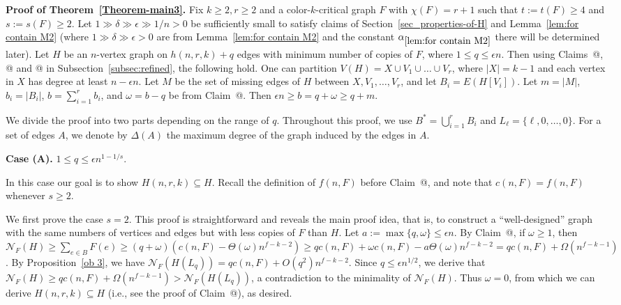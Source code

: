\documentclass[10pt]{article}
\makeatletter
\newcommand*{\rom}[1]{\expandafter\@slowromancap\romannumeral #1@}
\makeatother
\begin{document}
\medskip

{\noindent \bf Proof of Theorem~\ref{Theorem-main3}.}
Fix $k\geq 2, r\geq 2$ and a color-$k$-critical graph $F$ with $\chi(F)=r+1$ such that $t:=t(F)\geq 4$ and $s:=s(F)\geq 2$.
Let $1\gg\delta\gg \epsilon\gg 1/n>0$ be sufficiently small to satisfy claims of Section~\ref{sec_properties-of-H} and Lemma~\ref{lem:for contain M2} (where $1\gg\delta\gg \epsilon>0$ are from Lemma~\ref{lem:for contain M2} and the constant $\alpha_{\ref{lem:for contain M2}}$ there will be determined later).
Let $H$ be an $n$-vertex graph on $h(n,r,k)+q$ edges with minimum number of copies of $F$, where $1\leq q\leq \epsilon n$.
Then using Claims~\rom{1}, \rom{2} and \rom{3} in Subsection~\ref{subsec:refined}, the following hold.
One can partition $V(H)=X\cup V_1\cup \ldots \cup V_r$, where $|X|=k-1$ and each vertex in $X$ has degree at least $n-\epsilon n$.
Let $M$ be the set of missing edges of $H$ between $X, V_1,\ldots, V_r$, and let $B_i=E(H[V_i])$.
Let $m=|M|$, $b_i=|B_i|$, $b=\sum_{i=1}^{r}b_i$, and $\omega=b-q$ be from Claim~\rom{3}.
Then $\epsilon n\geq b=q+\omega\geq q+m$.

We divide the proof into two parts depending on the range of $q$.
Throughout this proof, we use $B^\ast=\bigcup_{i=1}^r B_i$ and $L_\ell=\{\ell,0,\ldots,0\}$.
For a set of edges $A$, we denote by $\Delta(A)$ the maximum degree of the graph induced by the edges in $A$.

\medskip

{\bf Case (A).} $1\leq q \leq \epsilon n^{1-1/s}$.

\medskip

In this case our goal is to show $H(n,r,k)\subseteq H$.
Recall the definition of $f(n,F)$ before Claim~\rom{3},
and note that $c(n,F)=f(n,F)$ whenever $s\geq 2$.

We first prove the case $s=2$.
This proof is straightforward and reveals the main proof idea, that is, to construct a ``well-designed'' graph with the same numbers of vertices and edges but with less copies of $F$ than $H$.
Let $a:=\max\{q,\omega\}\leq \epsilon n$.
By Claim~\rom{3}, if $\omega\geq 1$, then
$\mathcal{N}_F(H)\geq \sum_{e\in B}F(e)\geq (q+\omega)(c(n,F)- \Theta(\omega) n^{f-k-2})\geq qc(n,F)+\omega c(n,F)-a\Theta(\omega) n^{f-k-2}= qc(n,F)+\Omega(n^{f-k-1})$.
By Proposition~\ref{ob 3}, we have $\mathcal{N}_F(H(L_q))=qc(n,F)+O(q^2)n^{f-k-2}$.
Since $q\leq \epsilon n^{1/2}$, we derive that $\mathcal{N}_F(H)\geq qc(n,F)+\Omega(n^{f-k-1})> \mathcal{N}_F(H(L_q))$,
a contradiction to the minimality of $\mathcal{N}_F(H)$.
Thus $\omega=0$, from which we can derive $H(n,r,k)\subseteq H$ (i.e., see the proof of Claim~\rom{3}), as desired.
\end{document}
